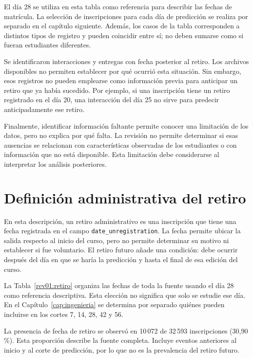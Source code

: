 El día 28 se utiliza en esta tabla como referencia para describir las fechas de matrícula. La selección de inscripciones para cada día de predicción se realiza por separado en el capítulo siguiente. Además, los casos de la tabla corresponden a distintos tipos de registro y pueden coincidir entre sí; no deben sumarse como si fueran estudiantes diferentes.

Se identificaron interacciones y entregas con fecha posterior al retiro. Los archivos disponibles no permiten establecer por qué ocurrió esta situación. Sin embargo, esos registros no pueden emplearse como información previa para anticipar un retiro que ya había sucedido. Por ejemplo, si una inscripción tiene un retiro registrado en el día 20, una interacción del día 25 no sirve para predecir anticipadamente ese retiro.

Finalmente, identificar información faltante permite conocer una limitación de los datos, pero no explica por qué falta. La revisión no permite determinar si esas ausencias se relacionan con características observadas de los estudiantes o con información que no está disponible. Esta limitación debe considerarse al interpretar los análisis posteriores.

\section{Definición administrativa del retiro}
En esta descripción, un retiro administrativo es una inscripción que tiene una fecha registrada en el campo \texttt{date\_unregistration}. La fecha permite ubicar la salida respecto al inicio del curso, pero no permite determinar su motivo ni establecer si fue voluntario. El retiro futuro añade una condición: debe ocurrir después del día en que se haría la predicción y hasta el final de esa edición del curso.

La Tabla~\ref{rev01:retiro} organiza las fechas de toda la fuente usando el día 28 como referencia descriptiva. Esta elección no significa que solo se estudie ese día. En el Capítulo~\ref{cap:ingenieria} se determina por separado quiénes pueden incluirse en los cortes 7, 14, 28, 42 y 56.

La presencia de fecha de retiro se observó en 10\,072 de 32\,593 inscripciones (30,90\,\%). Esta proporción describe la fuente completa. Incluye eventos anteriores al inicio y al corte de predicción, por lo que no es la prevalencia del retiro futuro.

